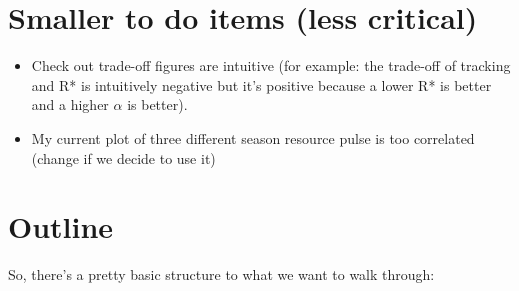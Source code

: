 \documentclass[11pt,letterpaper]{article}
\begin{document}
\section{Smaller to do items (less critical)} %
\begin{itemize}
\item Check out trade-off figures are intuitive (for example: the trade-off of tracking and R* is intuitively negative but it's positive because a lower R* is better and a higher $\alpha$ is better).
\item My current plot of three different season resource pulse is too correlated  (change if we decide to use it)
\end{itemize}

\section{Outline}
So, there's a pretty basic structure to what we want to walk through:
\end{document}
